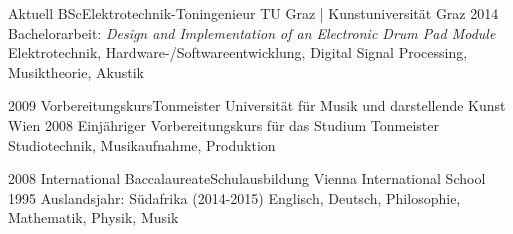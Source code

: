 %
%


\begin{experiences}
	\experience
	{Aktuell}
	{BSc}{Elektrotechnik-Toningenieur}
	{TU Graz | Kunstuniversität Graz}
	{2014}
	{
		Bachelorarbeit:
		\textit{Design and Implementation of an Electronic Drum Pad Module}
	}
	{
		Elektrotechnik,
		Hardware-/Softwareentwicklung,
		Digital Signal Processing,
		Musiktheorie,
		Akustik
	}
	
	\emptySeparator
	
	\experience
	{2009}
	{Vorbereitungskurs}{Tonmeister}
	{Universität für Musik und darstellende Kunst Wien}
	{2008}
	{
		Einjähriger Vorbereitungskurs für das Studium Tonmeister
	}
	{
		Studiotechnik,
		Musikaufnahme,
		Produktion
	}
	
	\emptySeparator
	
	\experience
	{2008}
	{International Baccalaureate}{Schulausbildung}
	{Vienna International School}
	{1995}
	{
		Auslandsjahr: Südafrika (2014-2015)
	}
	{
		Englisch,
		Deutsch,
		Philosophie,
		Mathematik,
		Physik,
		Musik
	}
\end{experiences}